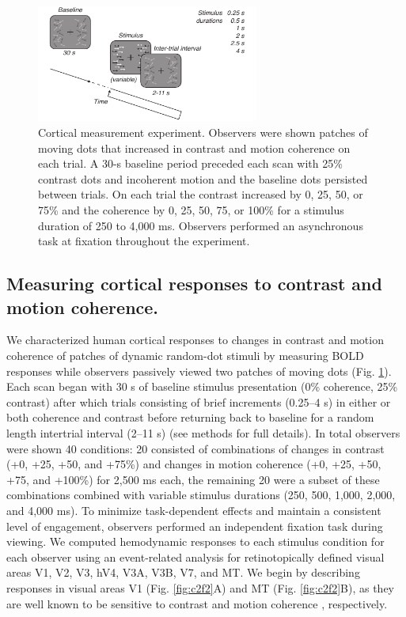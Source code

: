 \begin{figure}[ht]
\centering
\includegraphics[keepaspectratio,width=0.65\textwidth]{figs_c2/Fig1_task.pdf}
\caption[Cortical measurement experiment.]{Cortical measurement experiment. Observers were shown patches of moving dots that increased in contrast and motion coherence on each trial. A 30-s baseline period preceded each scan with 25\% contrast dots and incoherent motion and the baseline dots persisted between trials. On each trial the contrast increased by 0, 25, 50, or 75\% and the coherence by 0, 25, 50, 75, or 100\% for a stimulus duration of 250 to 4,000 ms. Observers performed an asynchronous task at fixation throughout the experiment.}
\label{fig:c2f1}
\end{figure}

\subsection{Measuring cortical responses to contrast and motion coherence.}

We characterized human cortical responses to changes in contrast and motion coherence of patches of dynamic random-dot stimuli by measuring BOLD responses while observers passively viewed two patches of moving dots (Fig. \ref{fig:c2f1}). Each scan began with 30 s of baseline stimulus presentation (0\% coherence, 25\% contrast) after which trials consisting of brief increments (0.25–4 s) in either or both coherence and contrast before returning back to baseline for a random length intertrial interval (2–11 s) (see methods for full details). In total observers were shown 40 conditions: 20 consisted of combinations of changes in contrast (+0, +25, +50, and +75\%) and changes in motion coherence (+0, +25, +50, +75, and +100\%) for 2,500 ms each, the remaining 20 were a subset of these combinations combined with variable stimulus durations (250, 500, 1,000, 2,000, and 4,000 ms). To minimize task-dependent effects and maintain a consistent level of engagement, observers performed an independent fixation task during viewing. We computed hemodynamic responses to each stimulus condition for each observer using an event-related analysis for retinotopically defined visual areas V1, V2, V3, hV4, V3A, V3B, V7, and MT. We begin by describing responses in visual areas V1 (Fig. \ref{fig:c2f2}A) and MT (Fig. \ref{fig:c2f2}B), as they are well known to be sensitive to contrast \citep{Avidan2002-jg,Boynton1996-ff,Gardner2005-pg,Logothetis2001-kk,Olman2004-dd,Tootell1995-gq,Tootell1998-mr} and motion coherence \citep{Britten1993-oh,Handel2007-xk,Rees2000-ul,Simoncelli1998-ts}, respectively.


